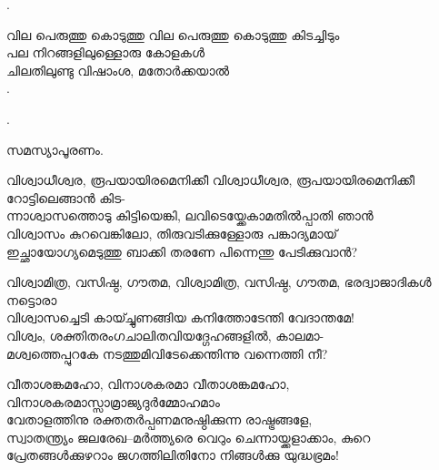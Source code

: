 \begin{enumerate}

.  

\begin{slokam}{\VDv}{\RV}{വില പെരുത്തു കൊടുത്തു}
വില പെരുത്തു കൊടുത്തു കിടച്ചിടും\\
പല നിറങ്ങളിലുള്ളൊരു കോളകള്‍\\
ചിലതിലുണ്ടു വിഷാംശ, മതോർക്കയാൽ\\
.
\end{slokam}


.

സമസ്യാപൂരണം. 


\begin{slokam}{\VSv}{\KochT}{വിശ്വാധീശ്വര, രൂപയായിരമെനിക്കീ}
വിശ്വാധീശ്വര, രൂപയായിരമെനിക്കീ റോട്ടിലെങ്ങാൻ കിട-\\
ന്നാശ്വാസത്തൊടു കിട്ടിയെങ്കി, ലവിടെയ്ക്കേകാമതിൽപ്പാതി ഞാൻ\\
വിശ്വാസം കുറവെങ്കിലോ, തിരുവടിക്കുള്ളോരു പങ്കാദ്യമായ്‌\\
ഇച്ഛായോഗ്യമെടുത്തു ബാക്കി തരണേ പിന്നെന്തു പേടിക്കുവാൻ?
\end{slokam}
 

\begin{slokam}{\VSv}{\VRV}{വിശ്വാമിത്ര, വസിഷ്ഠ, ഗൗതമ,}
 വിശ്വാമിത്ര, വസിഷ്ഠ, ഗൗതമ, ഭരദ്വാജാദികള്‍ നട്ടൊരാ\\
വിശ്വാസച്ചെടി കായ്ച്ചുണങ്ങിയ കനിത്തോടേന്തി വേദാന്തമേ!\\
വിശ്വം, ശക്തിതരംഗചാലിതവിയദ്ഗേഹങ്ങളിൽ, കാലമാ-\\
മശ്വത്തെപ്പുറകേ നടത്തുമിവിടേക്കെന്തിന്നു വന്നെത്തി നീ?
\end{slokam}





\begin{slokam}{\VSv}{\CKP}{വീതാശങ്കമഹോ, വിനാശകരമാ}
വീതാശങ്കമഹോ, വിനാശകരമാസ്സാമ്രാജ്യദുര്‍മ്മോഹമാം\\
വേതാളത്തിനു രക്തതര്‍പ്പണമനുഷ്ഠിക്കുന്ന രാഷ്ട്രങ്ങളേ,\\
സ്വാതന്ത്ര്യം ജലരേഖ--മര്‍ത്ത്യരെ വെറും ചെന്നായ്ക്കളാക്കാം, കുറെ\\
പ്രേതങ്ങള്‍ക്കുഴറാം ജഗത്തിലിതിനോ നിങ്ങള്‍ക്കു യുദ്ധഭ്രമം!
\end{slokam}




\end{enumerate}
